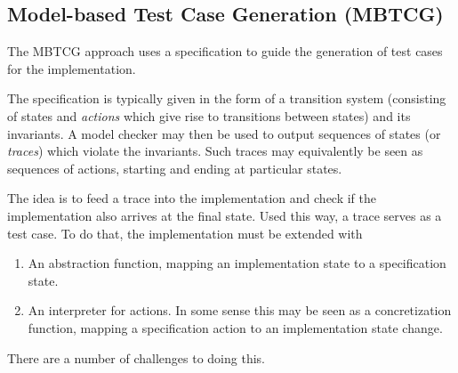 \documentclass[a4paper]{article}
\begin{document}
\subsection{Model-based Test Case Generation (MBTCG)}
\label{sec: interpreter}

The MBTCG approach uses a specification to guide the generation of test cases for the implementation.

The specification is typically given in the form of a transition system (consisting of states and \emph{actions} which give rise to transitions between states) and its invariants.
%
A model checker may then be used to output sequences of states (or \emph{traces}) which violate the invariants.
%
Such traces may equivalently be seen as sequences of actions, starting and ending at particular states.

The idea is to feed a trace into the implementation and check if the implementation also arrives at the final state. Used this way, a trace serves as a test case.
%
To do that, the implementation must be extended with

\begin{enumerate}
    \item An abstraction function, mapping an implementation state to a specification state.

    \item An interpreter for actions. In some sense this may be seen as a concretization function, mapping a specification action to an implementation state change.
\end{enumerate}

There are a number of challenges to doing this.
\end{document}
